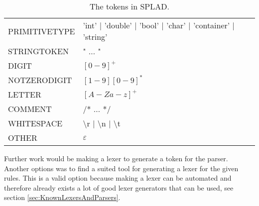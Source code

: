 \begin{table}[H]
\begin{tabular}{|l|l|}
\hline
PRIMITIVETYPE	& 'int' | 'double' | 'bool' | 'char' | 'container' | 'string' \\
STRINGTOKEN		& " $\dots$ " \\
DIGIT 			& $[0 - 9]^+$ \\
NOTZERODIGIT 	& $[1-9][0-9]^*$ \\
LETTER 			& $[A-Za-z]^+$\\
COMMENT 		& /* $\dots$ */ \\
WHITESPACE 		& \textbackslash r | \textbackslash n | \textbackslash t \\
OTHER 			& $\varepsilon$ \\ \hline
\end{tabular}
\caption{The tokens in SPLAD.}
\label{tab:tokens}
\end{table}

Further work would be making a lexer to generate a token for the parser. Another options was to find a suited tool for generating a lexer for the given rules. This is a valid option because making a lexer can be automated and therefore already exists a lot of good lexer generators that can be used, see section \ref{sec:KnownLexersAndParsers}.